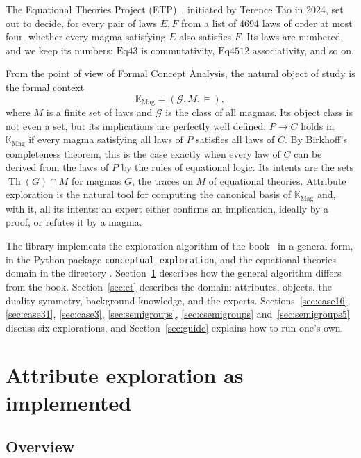 \documentclass[11pt,a4paper]{article}
\theoremstyle{definition}
\theoremstyle{remark}
\newcommand{\code}[1]{\texttt{#1}}
\newcommand{\Eq}[1]{\mathrm{Eq}#1}
\newcommand{\Th}{\operatorname{Th}}
\begin{document}
The Equational Theories Project (ETP)~\cite{ETP25}, initiated by Terence Tao in 2024, set out to decide, for every pair of laws $E, F$ from a list of 4694 laws of order at most four, whether every magma satisfying $E$ also satisfies $F$. Its laws are numbered, and we keep its numbers: $\Eq{43}$ is commutativity, $\Eq{4512}$ associativity, and so on.

From the point of view of Formal Concept Analysis, the natural object of study is the formal context
\[
  \mathbb{K}_{\mathrm{Mag}} = (\mathcal{G}, M, \models),
\]
where $M$ is a finite set of laws and $\mathcal{G}$ is the class of all magmas. Its object class is not even a set, but its implications are perfectly well defined: $P \to C$ holds in $\mathbb{K}_{\mathrm{Mag}}$ if every magma satisfying all laws of $P$ satisfies all laws of $C$. By Birkhoff's completeness theorem, this is the case exactly when every law of $C$ can be derived from the laws of $P$ by the rules of equational logic. Its intents are the sets $\Th(G) \cap M$ for magmas $G$, the traces on $M$ of equational theories. Attribute exploration is the natural tool for computing the canonical basis of $\mathbb{K}_{\mathrm{Mag}}$ and, with it, all its intents: an expert either confirms an implication, ideally by a proof, or refutes it by a magma.

The library implements the exploration algorithm of the book~\cite{GO16} in a general form, in the Python package \code{conceptual\_exploration}, and the equational-theories domain in the directory . Section~\ref{sec:library} describes how the general algorithm differs from the book. Section~\ref{sec:et} describes the domain: attributes, objects, the duality symmetry, background knowledge, and the experts. Sections~\ref{sec:case16}, \ref{sec:case31}, \ref{sec:case3}, \ref{sec:semigroups}, \ref{sec:csemigroups} and~\ref{sec:semigroups5} discuss six explorations, and Section~\ref{sec:guide} explains how to run one's own.

\section{Attribute exploration as implemented}\label{sec:library}

\subsection{Overview}
\end{document}
